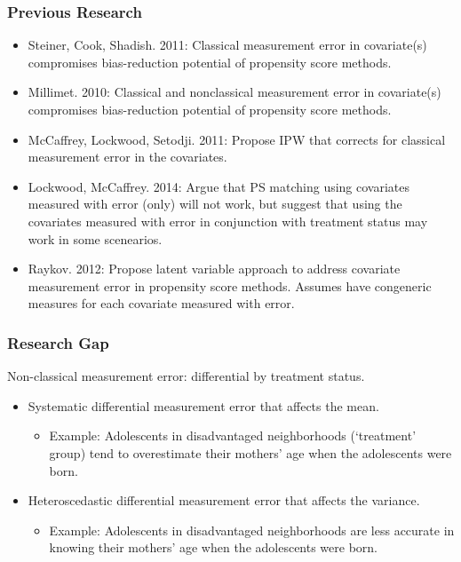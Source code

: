 \documentclass{beamer}
\begin{document}
\begin{frame}

\frametitle{ Previous Research}

\begin{itemize}
\item Steiner, Cook, Shadish. 2011: Classical measurement error in covariate(s) compromises bias-reduction potential of propensity score methods.
\item Millimet. 2010: Classical and nonclassical measurement error in covariate(s) compromises bias-reduction potential of propensity score methods. 
\item McCaffrey, Lockwood, Setodji. 2011: Propose IPW that corrects for classical measurement error in the covariates.
\item Lockwood, McCaffrey. 2014: Argue that PS matching using covariates measured with error (only) will not work, but suggest that using the covariates measured with error in conjunction with treatment status may work in some scenearios.
\item Raykov. 2012: Propose latent variable approach to address covariate measurement error in propensity score methods. Assumes have congeneric measures for each covariate measured with error. 
\end{itemize}

\end{frame} 

\begin{frame}

\frametitle{ Research Gap}


Non-classical measurement error: differential by treatment status.

\begin{itemize}
\item Systematic differential measurement error that affects the mean. 
\begin{itemize}
	\item Example: Adolescents in disadvantaged neighborhoods (`treatment' group) tend to overestimate their mothers' age when the adolescents were born.
\end{itemize}
\item Heteroscedastic differential measurement error that affects the variance.
\begin{itemize}
	\item Example: Adolescents in disadvantaged neighborhoods are less accurate in knowing their mothers' age when the adolescents were born.
\end{itemize}
\end{itemize}
 

\end{frame} 
\end{document}

